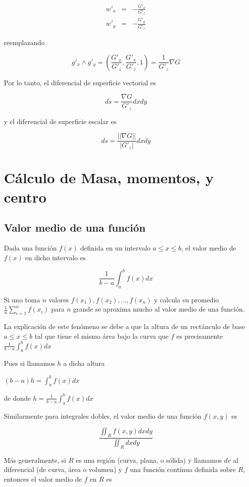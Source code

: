 \begin{eqnarray*} w'_x &=& - \frac{G'_x}{G'_z} \\
w'_y &=& - \frac{G'_y}{G'_z} \end{eqnarray*}

reemplazando

$$ g'_x \wedge g'_y = (\frac{G'_x}{G'_z}, \frac{G'_x}{G'_z}, 1) = \frac{1}{G'_z}\nabla G$$

Por lo tanto, el diferencial de superficie vectorial es

$$ ds = \frac{\nabla G}{G'_z}dxdy $$

y el diferencial de superficie escalar es

$$ ds = \frac{||\nabla G||}{|G'_z|}dxdy $$



\chapter{Cálculo de Masa, momentos, y centro}

\section{Valor medio de una función}

Dada una función $f(x)$ definida en un intervalo $a \leq x \leq b$, el valor medio de $f(x)$ en dicho intervalo es

$$ \frac{1}{b-a} \int_a^b f(x) dx $$

Si uno toma $n$ valores $f(x_1), f(x_2), \ldots, f(x_n)$ y calcula su promedio $\frac{1}{n} \sum_{i=1}^n f(x_i)$ para $n$ grande se aproxima mucho al valor medio de una función.

La explicación de este fenómeno se debe a que la altura de un rectánculo de base $a \leq x \leq b$ tal que tiene el mismo área bajo la curva que $f$ es precisamente $ \frac{1}{b-a} \int_a^b f(x) dx$

Pues si llamamos $h$ a dicha altura

$(b-a) h = \int_a^b f(x) dx$

de donde $ h = \frac{1}{b-a} \int_a^b f(x) dx$

Similarmente para integrales dobles, el valor medio de una función $f(x,y)$ es

$$ \frac{\iint_R f(x,y) dxdy}{ \iint_R dxdy }$$

Más generalmente, si $R$ es una región (curva, plana, o sólida) y llamamos $dv$ al diferencial (de curva, área o volumen) y $f$ una función contínua definida sobre $R$, entonces el valor medio de $f$ en $R$ es

